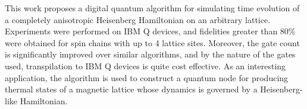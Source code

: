 This work proposes a digital quantum algorithm for simulating time evolution of a completely anisotropic Heisenberg Hamiltonian on an arbitrary lattice. Experiments were performed on IBM Q devices, and fidelities greater than 80\% were obtained for spin chains with up to 4 lattice sites. Moreover, the gate count is significantly improved over similar algorithms, and by the nature of the gates used, transpilation to IBM Q devices is quite cost effective. As an interesting application, the algorithm is used to construct a quantum node for producing thermal states of a magnetic lattice whose dynamics is governed by a Heisenberg-like Hamiltonian.
